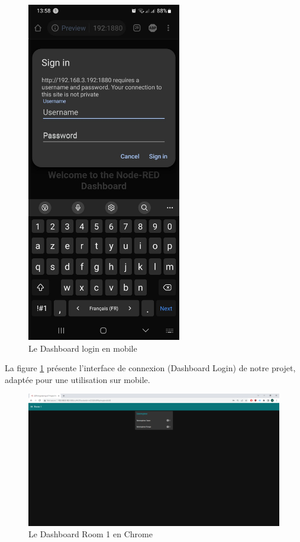 \begin{figure}[H]
\centering
\includegraphics[height=15cm]{Images/1006591.jpg}
\caption{Le Dashboard login en mobile}
\label{Chap4.3.22}
\end{figure}

La figure \ref{Chap4.3.22} présente l'interface de connexion (Dashboard Login) de notre projet, adaptée pour une utilisation sur mobile.

\begin{figure}[H]
\centering
\includegraphics[width=15cm]{Images/150131.png}
\caption{Le Dashboard Room 1 en Chrome}
\label{Chap4.3.23}
\end{figure}

